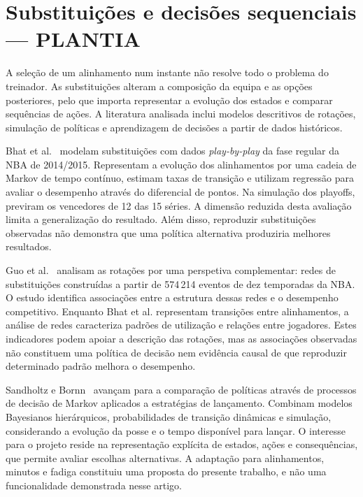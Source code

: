 \section{Substituições e decisões sequenciais --- PLANTIA}
\label{plantia:estado-da-arte-de-plantia}

A seleção de um alinhamento num instante não resolve todo o problema
do treinador. As substituições alteram a composição da equipa e as
opções posteriores, pelo que importa representar a evolução dos estados
e comparar sequências de ações. A literatura analisada inclui modelos
descritivos de rotações, simulação de políticas e aprendizagem de
decisões a partir de dados históricos.

Bhat et al.~\cite{bhatSubstitutions} modelam substituições com dados
\emph{play-by-play} da fase regular da NBA de 2014/2015. Representam a
evolução dos alinhamentos por uma cadeia de Markov de tempo contínuo,
estimam taxas de transição e utilizam regressão para avaliar o
desempenho através do diferencial de pontos. Na simulação dos playoffs,
previram os vencedores de 12 das 15 séries. A dimensão reduzida desta
avaliação limita a generalização do resultado. Além disso, reproduzir
substituições observadas não demonstra que uma política alternativa
produziria melhores resultados.

Guo et al.~\cite{guo2023} analisam as rotações por uma perspetiva
complementar: redes de substituições construídas a partir de 574\,214
eventos de dez temporadas da NBA. O estudo identifica associações entre
a estrutura dessas redes e o desempenho competitivo. Enquanto Bhat et
al. representam transições entre alinhamentos, a análise de redes
caracteriza padrões de utilização e relações entre jogadores. Estes
indicadores podem apoiar a descrição das rotações, mas as associações
observadas não constituem uma política de decisão nem evidência causal
de que reproduzir determinado padrão melhora o desempenho.

Sandholtz e Bornn~\cite{sandholtz2020} avançam para a comparação de
políticas através de processos de decisão de Markov aplicados a
estratégias de lançamento. Combinam modelos Bayesianos hierárquicos,
probabilidades de transição dinâmicas e simulação, considerando a
evolução da posse e o tempo disponível para lançar. O interesse para
o projeto reside na representação explícita de estados, ações e
consequências, que permite avaliar escolhas alternativas. A adaptação
para alinhamentos, minutos e fadiga constituiu uma proposta do presente
trabalho, e não uma funcionalidade demonstrada nesse artigo.

